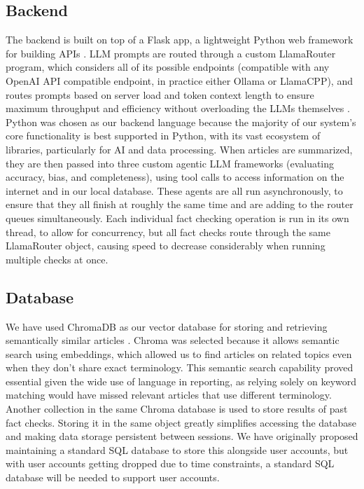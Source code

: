 \documentclass[conference]{IEEEtran}
\begin{document}
\subsection{Backend}
The backend is built on top of a Flask app, a lightweight Python web framework for building APIs \cite{flask}. LLM prompts are routed through a custom LlamaRouter program, which considers all of its possible endpoints (compatible with any OpenAI API compatible endpoint, in practice either Ollama or LlamaCPP), and routes prompts based on server load and token context length to ensure maximum throughput and efficiency without overloading the LLMs themselves \cite{openaiapi, ollama-docs, llamacpp}. Python was chosen as our backend language because the majority of our system's core functionality is best supported in Python, with its vast ecosystem of libraries, particularly for AI and data processing. 
When articles are summarized, they are then passed into three custom agentic LLM frameworks (evaluating accuracy, bias, and completeness), using tool calls to access information on the internet and in our local database. These agents are all run asynchronously, to ensure that they all finish at roughly the same time and are adding to the router queues simultaneously. Each individual fact checking operation is run in its own thread, to allow for concurrency, but all fact checks route through the same LlamaRouter object, causing speed to decrease considerably when running multiple checks at once.

\subsection{Database}
We have used ChromaDB as our vector database for storing and retrieving semantically similar articles \cite{chroma}. Chroma was selected because it allows semantic search using embeddings, which allowed us to find articles on related topics even when they don't share exact terminology. This semantic search capability proved essential given the wide use of language in reporting, as relying solely on keyword matching would have missed relevant articles that use different terminology. Another collection in the same Chroma database is used to store results of past fact checks. Storing it in the same object greatly simplifies accessing the database and making data storage persistent between sessions. We have originally proposed maintaining a standard SQL database to store this alongside user accounts, but with user accounts getting dropped due to time constraints, a standard SQL database will be needed to support user accounts.
\end{document}
